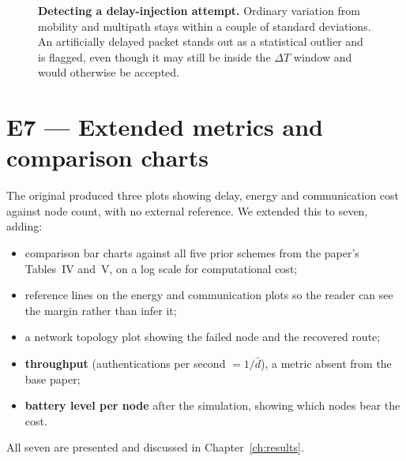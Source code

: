 \begin{figure}[H]
\centering
{}
\caption[Z-score delay anomaly detection]{\textbf{Detecting a delay-injection attempt.}
Ordinary variation from mobility and multipath stays within a couple of standard deviations.
An artificially delayed packet stands out as a statistical outlier and is flagged, even
though it may still be inside the $\Delta T$ window and would otherwise be accepted.}
\label{fig:zscore}
\end{figure}

\section{E7 --- Extended metrics and comparison charts}

The original produced three plots showing delay, energy and communication cost against node
count, with no external reference. We extended this to seven, adding:

\begin{itemize}
\item comparison bar charts against all five prior schemes from the paper's Tables~IV and~V,
      on a log scale for computational cost;
\item reference lines on the energy and communication plots so the reader can see the margin
      rather than infer it;
\item a network topology plot showing the failed node and the recovered route;
\item \textbf{throughput} (authentications per second $= 1/\bar{d}$), a metric absent from
      the base paper;
\item \textbf{battery level per node} after the simulation, showing which nodes bear the
      cost.
\end{itemize}

All seven are presented and discussed in Chapter~\ref{ch:results}.
